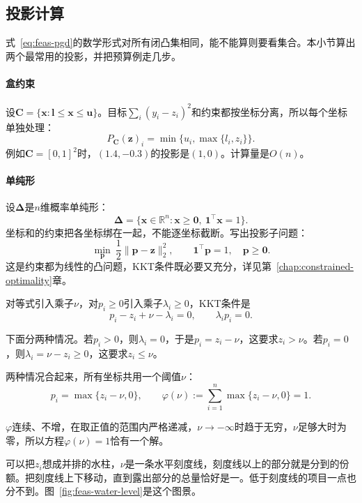 \subsection{投影计算}
\label{sec:feas-pgd-projection}

式~\eqref{eq:feas-pgd}的数学形式对所有闭凸集相同，能不能算则要看集合。本小节算出两个最常用的投影，并把预算例走几步。

\paragraph{盒约束}
设$\bm{C}=\{\bm{x}:\bm{l}\leq\bm{x}\leq\bm{u}\}$。目标$\sum_i(y_i-z_i)^2$和约束都按坐标分离，所以每个坐标单独处理：
\begin{equation}
 P_{\bm{C}}(\bm{z})_i=\min\bigl\{u_i,\max\{l_i,z_i\}\bigr\}.
 \label{eq:feas-box-projection}
\end{equation}
例如$\bm{C}=[0,1]^2$时，$(1.4,-0.3)$的投影是$(1,0)$。计算量是$O(n)$。

\paragraph{单纯形}
设$\bm{\Delta}$是$n$维概率单纯形：
\begin{equation}
 \bm{\Delta}=\{\bm{x}\in\mathbb{R}^n:\bm{x}\geq\bm{0},\ \bm{1}^\top\bm{x}=1\}.
 \label{eq:feas-simplex}
\end{equation}
坐标和的约束把各坐标绑在一起，不能逐坐标截断。写出投影子问题：
\[
 \min_{\bm{p}}\ \frac12\lVert\bm{p}-\bm{z}\rVert_2^2,
 \qquad
 \bm{1}^\top\bm{p}=1,\quad\bm{p}\geq\bm{0}.
\]
这是约束都为线性的凸问题，KKT条件既必要又充分，详见第~\ref{chap:constrained-optimality}章。

对等式引入乘子$\nu$，对$p_i\geq0$引入乘子$\lambda_i\geq0$，KKT条件是
\[
 p_i-z_i+\nu-\lambda_i=0,\qquad \lambda_ip_i=0.
\]

下面分两种情况。若$p_i>0$，则$\lambda_i=0$，于是$p_i=z_i-\nu$，这要求$z_i>\nu$。若$p_i=0$，则$\lambda_i=\nu-z_i\geq0$，这要求$z_i\leq\nu$。

两种情况合起来，所有坐标共用一个阈值$\nu$：
\begin{equation}
 p_i=\max\{z_i-\nu,0\},
 \qquad
 \varphi(\nu):=\sum_{i=1}^n\max\{z_i-\nu,0\}=1.
 \label{eq:feas-simplex-projection}
\end{equation}

$\varphi$连续、不增，在取正值的范围内严格递减，$\nu\to-\infty$时趋于无穷，$\nu$足够大时为零，所以方程$\varphi(\nu)=1$恰有一个解。

可以把$z_i$想成并排的水柱，$\nu$是一条水平刻度线，刻度线以上的部分就是分到的份额。把刻度线上下移动，直到露出部分的总量恰好是一。低于刻度线的项目一点也分不到。图~\ref{fig:feas-water-level}是这个图景。

